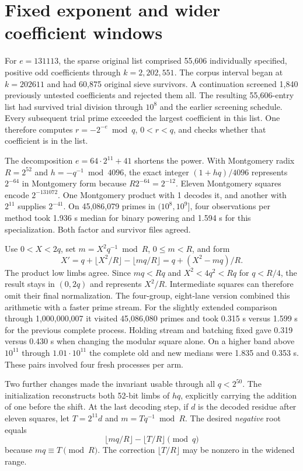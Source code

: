 \documentclass[11pt,a4paper,oneside,openany]{report}
\begin{document}
\section{Fixed exponent and wider coefficient windows}
For $e=131113$, the sparse original list comprised 55,606 individually specified, positive odd coefficients through $k=2{,}202{,}551$. The corpus interval began at $k=202611$ and had 60,875 original sieve survivors. A continuation screened 1,840 previously untested coefficients and rejected them all. The resulting 55,606-entry list had survived trial division through $10^8$ and the earlier screening schedule. Every subsequent trial prime exceeded the largest coefficient in this list. One therefore computes $r=-2^{-e}\bmod q$, $0<r<q$, and checks whether that coefficient is in the list.

The decomposition $e=64\cdot 2^{11}+41$ shortens the power. With Montgomery radix $R=2^{52}$ and $h=-q^{-1}\bmod4096$, the exact integer $(1+hq)/4096$ represents $2^{-64}$ in Montgomery form because $R2^{-64}=2^{-12}$. Eleven Montgomery squares encode $2^{-131072}$. One Montgomery product with 1 decodes it, and another with $2^{11}$ supplies $2^{-41}$. On 45,086,079 primes in $(10^8,10^9]$, four observations per method took 1.936 s median for binary powering and 1.594 s for this specialization. Both factor and survivor files agreed.

Use $0<X<2q$, set $m=X^2q^{-1}\bmod R$, $0\le m<R$, and form
\[
 X'=q+\lfloor X^2/R\rfloor-\lfloor mq/R\rfloor
    =q+(X^2-mq)/R .
\]
The product low limbs agree. Since $mq<Rq$ and $X^2<4q^2<Rq$ for $q<R/4$, the result stays in $(0,2q)$ and represents $X^2/R$. Intermediate squares can therefore omit their final normalization. The four-group, eight-lane version combined this arithmetic with a faster prime stream. For the slightly extended comparison through 1,000,000,007 it visited 45,086,080 primes and took 0.315 s versus 1.599 s for the previous complete process. Holding stream and batching fixed gave 0.319 versus 0.430 s when changing the modular square alone. On a higher band above $10^{11}$ through $1.01\cdot10^{11}$ the complete old and new medians were 1.835 and 0.353 s. These pairs involved four fresh processes per arm.

Two further changes made the invariant usable through all $q<2^{50}$. The initialization reconstructs both 52-bit limbs of $hq$, explicitly carrying the addition of one before the shift. At the last decoding step, if $d$ is the decoded residue after eleven squares, let $T=2^{11}d$ and $m=Tq^{-1}\bmod R$. The desired \emph{negative} root equals
\[
      \lfloor mq/R\rfloor-\lfloor T/R\rfloor\pmod q
\]
because $mq\equiv T\pmod R$. The correction $\lfloor T/R\rfloor$ may be nonzero in the widened range.
\end{document}
